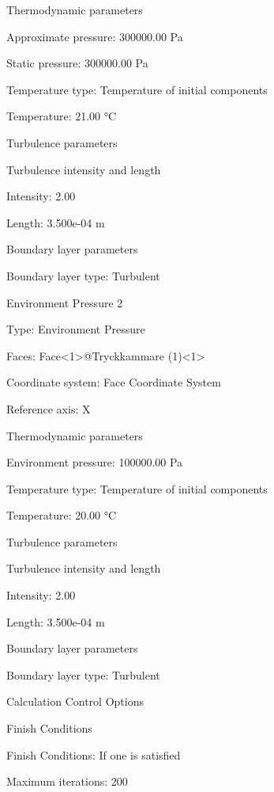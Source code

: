            Thermodynamic parameters 

                Approximate pressure:   300000.00 Pa 

                Static pressure:   300000.00 Pa 


                Temperature type:   Temperature of initial components 

                Temperature:   21.00 °C 

            Turbulence parameters 

                Turbulence intensity and length 

                Intensity:   2.00 %

                Length:   3.500e-04 m 

            Boundary layer parameters 

                Boundary layer type:   Turbulent 


            Environment Pressure 2 

                Type:   Environment Pressure 

                Faces:   Face<1>@Tryckkammare (1)<1> 

                Coordinate system:   Face Coordinate System 

                Reference axis:   X 

  

            Thermodynamic parameters 

                Environment pressure:   100000.00 Pa 

                Temperature type:   Temperature of initial components 

                Temperature:   20.00 °C 

            Turbulence parameters 


                Turbulence intensity and length 

                Intensity:   2.00 %

                Length:   3.500e-04 m 

            Boundary layer parameters 

                Boundary layer type:   Turbulent 

    Calculation Control Options 

        Finish Conditions 

                Finish Conditions:   If one is satisfied 

                Maximum iterations:   200 

